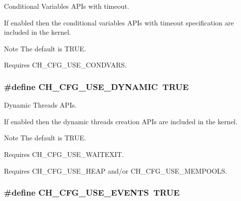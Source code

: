 Conditional Variables A\+P\+Is with timeout. 

If enabled then the conditional variables A\+P\+Is with timeout specification are included in the kernel.

\begin{DoxyNote}{Note}
The default is {\ttfamily T\+R\+U\+E}. 

Requires {\ttfamily C\+H\+\_\+\+C\+F\+G\+\_\+\+U\+S\+E\+\_\+\+C\+O\+N\+D\+V\+A\+R\+S}. 
\end{DoxyNote}
\hypertarget{group__config_ga6ae82f40768d872dea807aac79e38deb}{
\subsubsection[{C\+H\+\_\+\+C\+F\+G\+\_\+\+U\+S\+E\+\_\+\+D\+Y\+N\+A\+M\+I\+C}]{\setlength{\rightskip}{0pt plus 5cm}\#define C\+H\+\_\+\+C\+F\+G\+\_\+\+U\+S\+E\+\_\+\+D\+Y\+N\+A\+M\+I\+C~T\+R\+U\+E}}\label{group__config_ga6ae82f40768d872dea807aac79e38deb}


Dynamic Threads A\+P\+Is. 

If enabled then the dynamic threads creation A\+P\+Is are included in the kernel.

\begin{DoxyNote}{Note}
The default is {\ttfamily T\+R\+U\+E}. 

Requires {\ttfamily C\+H\+\_\+\+C\+F\+G\+\_\+\+U\+S\+E\+\_\+\+W\+A\+I\+T\+E\+X\+I\+T}. 

Requires {\ttfamily C\+H\+\_\+\+C\+F\+G\+\_\+\+U\+S\+E\+\_\+\+H\+E\+A\+P} and/or {\ttfamily C\+H\+\_\+\+C\+F\+G\+\_\+\+U\+S\+E\+\_\+\+M\+E\+M\+P\+O\+O\+L\+S}. 
\end{DoxyNote}
\hypertarget{group__config_ga1469eb9d4445e870ed1a45a841c10fb3}{
\subsubsection[{C\+H\+\_\+\+C\+F\+G\+\_\+\+U\+S\+E\+\_\+\+E\+V\+E\+N\+T\+S}]{\setlength{\rightskip}{0pt plus 5cm}\#define C\+H\+\_\+\+C\+F\+G\+\_\+\+U\+S\+E\+\_\+\+E\+V\+E\+N\+T\+S~T\+R\+U\+E}}\label{group__config_ga1469eb9d4445e870ed1a45a841c10fb3}


